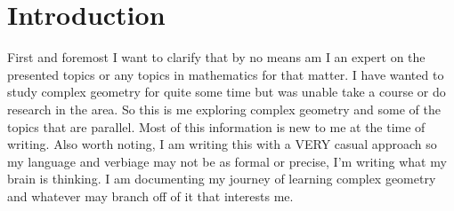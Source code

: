 \thispagestyle{empty}
\section*{Introduction}
First and foremost I want to clarify that by no means am I an expert on the presented
topics or any topics in mathematics for that matter. I have wanted to study complex
geometry for quite some time but was unable take a course or do research in the area.
So this is me exploring complex geometry and some of the topics that are parallel.
Most of this information is new to me at the time of writing. Also worth noting,
I am writing this with a VERY casual approach so my language and verbiage may not be
as formal or precise, I'm writing what my brain is thinking. I am documenting my
journey of learning complex geometry and whatever may branch off of it that interests
me.